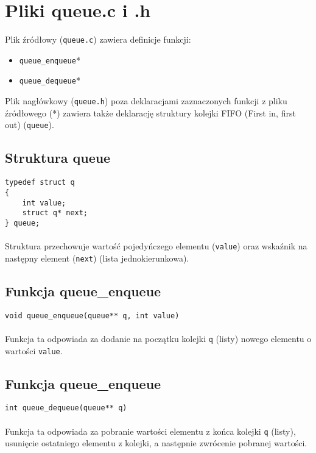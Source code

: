 \documentclass[11pt,a4paper]{report}
\begin{document}
    \newpage
    \section{Pliki queue.c i .h}
    Plik źródłowy (\verb|queue.c|) zawiera definicje funkcji:
    \begin{itemize}
        \item \verb|queue_enqueue|*
        \item \verb|queue_dequeue|*
    \end{itemize}
    Plik nagłówkowy (\verb|queue.h|) poza deklaracjami zaznaczonych funkcji z pliku źródłowego (*) zawiera także deklarację struktury kolejki FIFO (First in, first out) (\verb|queue|).\\
    \subsection{Struktura queue}
    \verb|typedef struct q|\\
    \verb|{|\\
    \verb|    int value;|\\
    \verb|    struct q* next;|\\
    \verb|} queue;|\\
    \\
    Struktura przechowuje wartość pojedyńczego elementu (\verb|value|) oraz wskaźnik na następny element (\verb|next|) (lista jednokierunkowa).\\
    \subsection{Funkcja queue\_enqueue}
    \verb|void queue_enqueue(queue** q, int value)|\\
    \\
    Funkcja ta odpowiada za dodanie na początku kolejki \verb|q| (listy) nowego elementu o wartości \verb|value|.\\
    \subsection{Funkcja queue\_enqueue}
    \verb|int queue_dequeue(queue** q)|\\
    \\
    Funkcja ta odpowiada za pobranie wartości elementu z końca kolejki \verb|q| (listy), usunięcie ostatniego elementu z kolejki, a następnie zwrócenie pobranej wartości.\\

    \newpage
\end{document}
